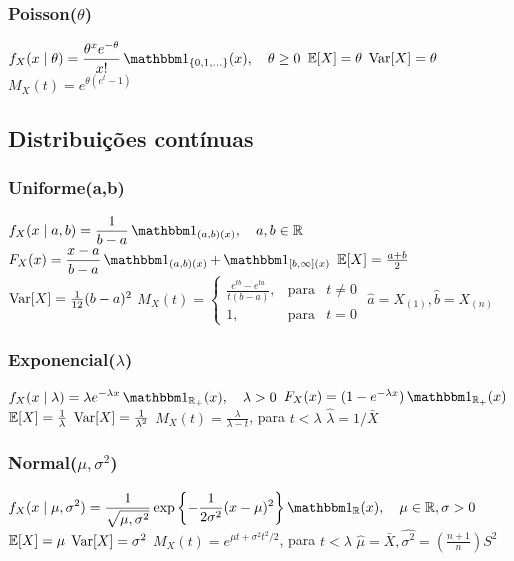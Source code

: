 \subsubsection{Poisson($\theta$)}
\begin{outline}
	\1 \(\displaystyle f_X(x \mid \theta) = \frac{\theta^x e^{-\theta}}{x!} \ind_{\{0,1,\ldots\}}(x), \quad \theta \geq 0\)
	\1 \( \operatorname{\mathbb{E}}[X] = \theta \)
	\1 \( \operatorname{Var}[X] = \theta \)
	\1 \(\displaystyle M_X(t) = e^{\theta(e^t-1)} \) 
\end{outline}

\subsection{Distribuições contínuas}
\subsubsection{Uniforme(a,b)}
\begin{outline}
	\1 \(\displaystyle f_X(x \mid a,b) = \frac{1}{b-a}\ind_{(a,b)(x)}, \quad a,b \in \Re \)
	\1 \(\displaystyle F_X(x) = \frac{x-a}{b-a}\ind_{(a,b)(x)} + \ind_{[b, \infty](x)}\)
	\1 \( \operatorname{\mathbb{E}}[X] = \frac{a+b}{2} \)
	\1 \( \operatorname{Var}[X] = \frac{1}{12}(b-a)^2 \)
	\1 \( M_X(t) = \left\{ 
	\begin{array}{lcl}\displaystyle
		\frac{e^{tb}-e^{ta}}{t(b-a)}, & \text{para} & t\neq0 \\
		1, & \text{para} & t=0
	\end{array} \right. \)
	\1 \(\hat{a}=X_{(1)}, \hat{b}=X_{(n)}\)
\end{outline}

\subsubsection{Exponencial($\lambda$)}
\begin{outline}
	\1 \(\displaystyle f_X(x \mid \lambda) = \lambda e^{-\lambda x} \ind_{\Re_+}(x), \quad \lambda>0\)
	\1 \( F_X(x) = (1-e^{-\lambda x})\ind_{\Re_+}(x) \)
	\1 \( \operatorname{\mathbb{E}}[X] = \frac{1}{\lambda} \)
	\1 \( \operatorname{Var}[X] = \frac{1}{\lambda^2} \)
	\1 \(\displaystyle M_X(t) = \frac{\lambda}{\lambda-t}\), para  $t<\lambda$
	\1 \( \hat{\lambda} = 1/\bar{X} \)
\end{outline}

\subsubsection{Normal($\mu, \sigma^2$)}
\begin{outline}
	\1 \(\displaystyle f_X(x\mid \mu, \sigma^2) = \frac{1}{\sqrt{\mu, \sigma^2}}\exp\left\{{-\frac{1}{2\sigma^2}}(x-\mu)^2\right\} \ind_{\Re}(x), \quad \mu\in\Re, \sigma>0\)
	\1 \( \operatorname{\mathbb{E}}[X] = \mu \)
	\1 \( \operatorname{Var}[X] = \sigma^2 \)
	\1 \(\displaystyle M_X(t) = e^{\mu t + \sigma^2 t^2/2} \), para  $t<\lambda$
	\1 \( \hat{\mu} = \bar{X}, \hat{\sigma^2} = \left(\frac{n+1}{n}\right) S^2 \)
\end{outline}

